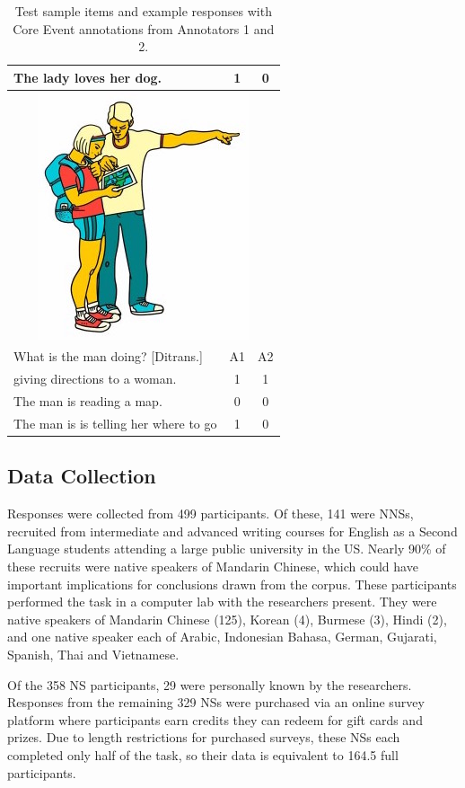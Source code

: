 \documentclass[11pt,a4paper]{article}
\begin{document}
\begin{table}[htb!]
\begin{center}
\begin{tabular}{|l|c|c|}
\hline
The lady loves her dog. & 1 & 0 \\
\hline
\hline
\multicolumn{3}{|c|}{\includegraphics[width=0.5\columnwidth]{figures/I28.jpg}} \\
\hline
What is the man doing? [Ditrans.] & A1 & A2 \\
\hline
giving directions to a woman. & 1 & 1 \\
\hline
The man is reading a map. & 0 & 0 \\
\hline
The man is is telling her where to go & 1 & 0 \\
\hline
\end{tabular}
\caption{\label{tab:test-sample-items} Test sample items and example responses with Core Event annotations from Annotators 1 and 2.}
\end{center}
\end{table}


\subsection{Data Collection}

Responses were collected from 499 participants. Of these, 141 were NNSs, recruited from intermediate and advanced writing courses for English as a Second Language students attending a large public university in the US. Nearly 90\% of these recruits were native speakers of Mandarin Chinese, which could have important implications for conclusions drawn from the corpus. These participants performed the task in a computer lab with the researchers present. They were native speakers of Mandarin Chinese (125), Korean (4), Burmese (3), Hindi (2), and one native speaker each of Arabic, Indonesian Bahasa, German, Gujarati, Spanish, Thai and Vietnamese.

Of the 358 NS participants, 29 were personally known by the researchers. Responses from the remaining 329 NSs were purchased via an online survey platform where participants earn credits they can redeem for gift cards and prizes. Due to length restrictions for purchased surveys, these NSs each completed only half of the task, so their data is equivalent to 164.5 full participants.
\end{document}
